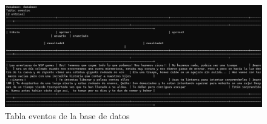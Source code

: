 \documentclass{report}
\begin{document}
                \begin{figure}[H]
                    \centering
                    \includegraphics[width=1\textwidth]{./img/vulnerabilidades/2.3/1.3.png}
                    \caption{Tabla eventos de la base de datos}
                \end{figure}
                \clearpage
\end{document}
